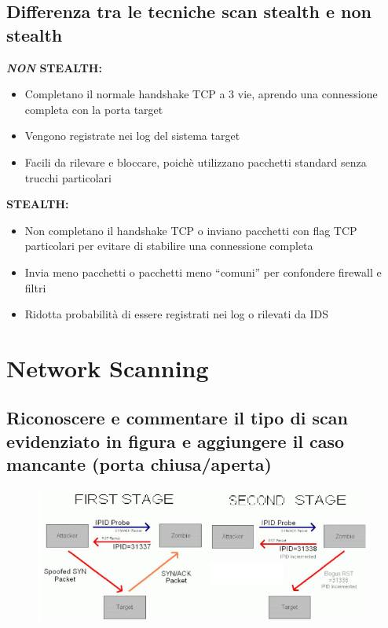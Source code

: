 \documentclass{report}
\begin{document}
\section{Differenza tra le tecniche scan stealth e non stealth}
\noindent \textbf{\textit{NON} STEALTH:}
\begin{itemize}
    \item Completano il normale handshake TCP a 3 vie, aprendo una connessione completa con la porta target
    \item Vengono registrate nei log del sistema target 
    \item Facili da rilevare e bloccare, poichè utilizzano pacchetti standard senza trucchi particolari
\end{itemize}

\noindent \textbf{STEALTH:}
\begin{itemize}
    \item Non completano il handshake TCP o inviano pacchetti con flag TCP particolari per evitare di stabilire una connessione completa
    \item Invia meno pacchetti o pacchetti meno “comuni” per confondere firewall e filtri
    \item Ridotta probabilità di essere registrati nei log o rilevati da IDS
\end{itemize}



\chapter{Network Scanning}
\section{Riconoscere e commentare il tipo di scan evidenziato in figura e aggiungere il caso mancante (porta chiusa/aperta)}
\begin{figure}[H]
    \centering
    \includegraphics[width=1\linewidth]{images/scanEvidenziato.png}
\end{figure}
\end{document}
